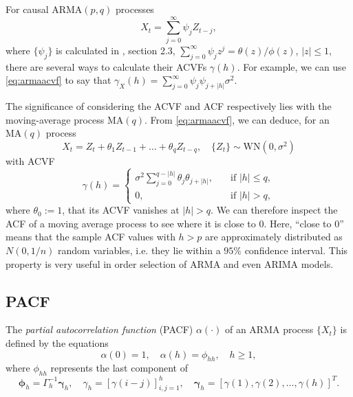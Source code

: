 \documentclass[a4paper, oneside]{discothesis}
\begin{document}
For causal ARMA$(p, q)$ processes
\begin{equation*}
    X_t = \sum_{j=0}^\infty \psi_j Z_{t-j},
\end{equation*}
where $\{\psi_j\}$ is calculated in \cite{itsf}, section 2.3, $\sum_{j=0}^\infty \psi_j z^j = \theta(z)/\phi(z)$, $|z| \leq 1$, there are several ways to calculate their ACVFs $\gamma(h)$. For example, we can use \eqref{eq:armaacvf} to say that $\gamma_X(h) = \sum_{j=0}^\infty \psi_j \psi_{j+|h|} \sigma^2. \label{eq:causalacvf}$ 

The significance of considering the ACVF and ACF respectively lies with the moving-average process $\mathrm{MA}(q)$. From \eqref{eq:armaacvf}, we can deduce, for an $\mathrm{MA}(q)$ process
\begin{equation*}
    X_t = Z_t + \theta_1 Z_{t-1} + \dots + \theta_q Z_{t-q},\quad\{Z_t\} \sim \mathrm{WN}(0, \sigma^2)
\end{equation*}
with ACVF
\begin{equation*}
    \gamma(h) =
    \begin{cases}
        \sigma^2\sum_{j=0}^{q-|h|}\theta_j \theta_{j+|h|}, \quad &\text{if } |h| \leq q, \\
        0, &\text{if } |h| > q,
    \end{cases}
\end{equation*}
where $\theta_0 := 1$, that its ACVF vanishes at $|h| > q$. We can therefore inspect the ACF of a moving average process to see where it is close to $0$. Here, ``close to $0$'' means that the sample ACF values with $h > p$ are approximately distributed as $N(0, 1/n)$ random variables, i.e. they lie within a $95\%$ confidence interval. This property is very useful in order selection of ARMA and even ARIMA models.

\subsection{PACF}
The \textit{partial autocorrelation function} (PACF) $\alpha(\cdot)$ of an ARMA process $\{X_t\}$ is defined by the equations
\begin{equation*}
    \alpha(0) = 1, \quad \alpha(h) = \phi_{hh}, \quad h \geq 1,
\end{equation*}
where $\phi_{hh}$ represents the last component of
\begin{equation*}
    \boldsymbol{\phi}_h = \Gamma_h^{-1} \boldsymbol{\gamma}_h, \quad \gamma_h = [\gamma(i-j)]^h_{i, j=1}, \quad \boldsymbol{\gamma}_h = [\gamma(1), \gamma(2), \dots, \gamma(h)]^T.
\end{equation*}
\end{document}
